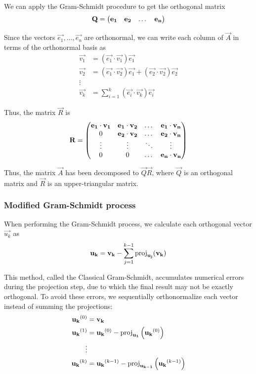 \documentclass{article}
\begin{document}
We can apply the Gram-Schmidt procedure to get the orthogonal matrix
\begin{align}    
\mathbf{Q} = \begin{pmatrix}\mathbf{e_1} & \mathbf{e_2} & \dots & \mathbf{e_n}\end{pmatrix}
\end{align}

Since the vectors $\vec{e_1}, \dots, \vec{e_n}$ are orthonormal, we can
write each column of $\vec{A}$ in terms of the orthonormal basis as
\begin{align}
\vec{v_1} &= (\vec{e_1} \cdot \vec{v_1}) \vec{e_1} \\
\vec{v_2} &= (\vec{e_1} \cdot \vec{v_2}) \vec{e_1} + (\vec{e_2} \cdot \vec{v_2}) \vec{e_2} \\
\vdots \\
\vec{v_k} &= \sum_{i=1}^k (\vec{e_i} \cdot \vec{v_k}) \vec{e_i}
\end{align}

Thus, the matrix $\vec{R}$ is
\begin{align}
    \mathbf{R} = \begin{pmatrix}
        \mathbf{e_1} \cdot \mathbf{v_1} & \mathbf{e_1} \cdot \mathbf{v_2} & \dots  & \mathbf{e_1} \cdot \mathbf{v_n} \\
        0                         & \mathbf{e_2} \cdot \mathbf{v_2} & \dots  & \mathbf{e_2} \cdot \mathbf{v_n} \\
        \vdots                    & \vdots                    & \ddots & \vdots                    \\
        0                         & 0                         & \dots  & \mathbf{e_n} \cdot \mathbf{v_n}
    \end{pmatrix}
\end{align}

Thus, the matrix $\vec{A}$ has been decomposed to $\vec{Q}\vec{R}$, where $\vec{Q}$ is
an orthogonal matrix and $\vec{R}$ is an upper-triangular matrix.

\subsubsection{Modified Gram-Schmidt process}

When performing the Gram-Schmidt process, we calculate each orthogonal vector $\vec{u_k}$ as 
\begin{align}
    \mathbf{u_k} = \mathbf{v_k} - \sum_{j=1}^{k-1} \operatorname{proj}_{\mathbf{u_j}}(\mathbf{v_k})
\end{align}

This method, called the Classical Gram-Schmidt, accumulates numerical errors
during the projection step, due to which the final result may not be exactly
orthogonal. To avoid these errors, we sequentially orthonormalize each vector
instead of summing the projections:
\begin{align}
    \mathbf{u_k}^{(0)} &= \mathbf{v_k} \\
    \mathbf{u_k}^{(1)} &= \mathbf{u_k}^{(0)} - \operatorname{proj}_{\mathbf{u_1}}\left(\mathbf{u_k}^{(0)}\right) \\
    \vdots \\
    \mathbf{u_k}^{(k)} &= \mathbf{u_k}^{(k-1)} - \operatorname{proj}_{\mathbf{u_{k-1}}}\left(\mathbf{u_k}^{(k-1)}\right) \\
\end{align}
\end{document}
